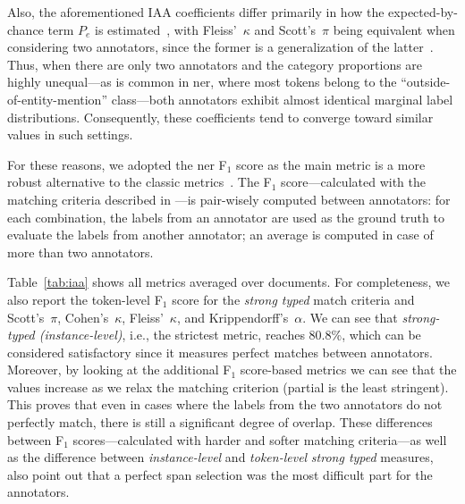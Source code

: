 Also, the aforementioned IAA coefficients differ primarily in how the expected-by-chance term $P_e$ is estimated~\cite{vanOest2019}, with Fleiss'~$\kappa$ and Scott's~$\pi$ being equivalent when considering two annotators, since the former is a generalization of the latter~\cite{HayesKrippendorff2007}. Thus, when there are only two annotators and the category proportions are highly unequal---as is common in \ac{ner}, where most tokens belong to the ``outside-of-entity-mention'' class---both annotators exhibit almost identical marginal label distributions. Consequently, these coefficients tend to converge toward similar values in such settings.

For these reasons, we adopted the \ac{ner} F$_1$ score as the main metric is a more robust alternative to the classic metrics~\cite{hripcsak2005agreement, grouin2011proposal}.
The F$_1$ score---calculated with the matching criteria described in ---is pair-wisely computed between annotators: for each combination, the labels from an annotator are used as the ground truth to evaluate the labels from another annotator; an average is computed in case of more than two annotators. 

Table~\ref{tab:iaa} shows all metrics averaged over documents. For completeness, we also report the token-level F$_1$ score for the \textit{strong typed} match criteria and Scott's~$\pi$, Cohen's~$\kappa$, Fleiss'~$\kappa$, and Krippendorff's~$\alpha$.
We can see that \textit{strong-typed (instance-level)}, i.e., the strictest metric, reaches 80.8\%, which can be considered satisfactory since it measures perfect matches between annotators. Moreover, by looking at the additional F$_1$ score-based metrics we can see that the values increase as we relax the matching criterion (partial is the least stringent). This proves that even in cases where the labels from the two annotators do not perfectly match, there is still a significant degree of overlap.
These differences between F$_1$ scores---calculated with harder and softer matching criteria---as well as the difference between \textit{instance-level} and \textit{token-level} \textit{strong typed} measures, also point out that a perfect span selection was the most difficult part for the annotators.

